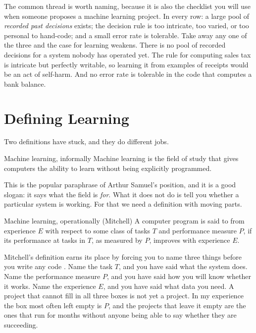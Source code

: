 The common thread is worth naming, because it is also the checklist you will use
when someone proposes a machine learning project. In every row: a large pool of
\emph{recorded past decisions} exists; the decision rule is too intricate,
too varied, or too personal to hand-code; and a small error rate is tolerable.
Take away any one of the three and the case for learning weakens. There is no
pool of recorded decisions for a system nobody has operated yet. The rule for
computing sales tax is intricate but perfectly writable, so learning it from
examples of receipts would be an act of self-harm. And no error rate is
tolerable in the code that computes a bank balance.

\section{Defining Learning}
\label{sec:defining}

Two definitions have stuck, and they do different jobs.

\begin{defbox}{Machine learning, informally}
Machine learning is the field of study that gives computers the ability to learn
without being explicitly programmed.
\end{defbox}

This is the popular paraphrase of Arthur Samuel's position, and it is a good
slogan: it says what the field is \emph{for}. What it does not do is tell you
whether a particular system is working. For that we need a definition with
moving parts.

\begin{defbox}{Machine learning, operationally (Mitchell)}
A computer program is said to  from experience $E$ with respect to
some class of tasks $T$ and performance measure $P$, if its performance at tasks
in $T$, as measured by $P$, improves with experience $E$.
\end{defbox}

Mitchell's definition earns its place by forcing you to name three things before
you write any code \parencite{mitchell1997}. Name the task $T$, and you have
said what the system does. Name the performance measure $P$, and you have said
how you will know whether it works. Name the experience $E$, and you have said
what data you need. A project that cannot fill in all three boxes is not yet a
project. In my experience the box most often left empty is $P$, and the projects
that leave it empty are the ones that run for months without anyone being able
to say whether they are succeeding.

